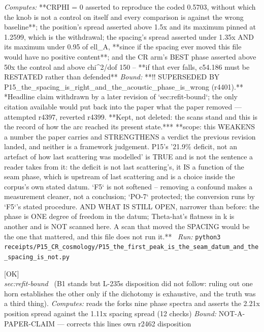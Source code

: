 \begin{description}
\emph{Computes:} **CRPHI = 0 asserted to reproduce the coded 0.5703, without which the knob is not a control on itself and every comparison is against the wrong baseline**; the position's spread asserted above 1.5x and its maximum pinned at 1.2599, which is the withdrawal; the spacing's spread asserted under 1.35x AND its maximum under 0.95 of ell\_A, **since if the spacing ever moved this file would have no positive content**; and the CR arm's BEST phase asserted above 50x the control and above chi\textasciicircum{}2/dof 150 -- **if that ever falls, c54.186 must be RESTATED rather than defended**
 \emph{Bound:} **!! SUPERSEDED BY P15\_the\_spacing\_is\_right\_and\_the\_acoustic\_phase\_is\_wrong (r4401).** *Headline claim withdrawn by a later revision of `sec:refit-bound`; the only citation available would put back into the paper what the paper removed --- attempted r4397, reverted r4399. **Kept, not deleted: the scans stand and this is the record of how the arc reached its present state.*** **scope: this WEAKENS a number the paper carries and STRENGTHENS a verdict the previous revision landed, and neither is a framework judgement. P15's '21.9\% deficit, not an artefact of how last scattering was modelled' is TRUE and is not the sentence a reader takes from it: the deficit is not last scattering's, it IS a function of the seam phase, which is upstream of last scattering and is a choice inside the corpus's own stated datum. `F5` is not softened -- removing a confound makes a measurement cleaner, not a conclusion; `PO-7` protected; the conversion runs by `F5`'s stated procedure. AND WHAT IS STILL OPEN, narrower than before: the phase is ONE degree of freedom in the datum; Theta-hat's flatness in k is another and is NOT scanned here. A scan that moved the SPACING would be the one that mattered, and this file does not run it.**
\ \emph{Run:} \texttt{python3 receipts/P15\_CR\_cosmology/P15\_the\_first\_peak\_is\_the\_seam\_datum\_and\_the\_spacing\_is\_not.py}
\item[\label{rcpt:B3_a_dichotomy_stated_is_not_a_dichotomy_proved}\texttt{B3\_a\_dichotomy\_stated\_is\_not\_a\_dichotomy\_proved}]\hfill\textsf{[OK]}\\
\textit{sec:refit-bound} \ (B1 stands but L-235s disposition did not follow: ruling out one horn establishes the other only if the dichotomy is exhaustive, and the truth was a third thing). 
\emph{Computes:} reads the forks nine phase spectra and asserts the 2.21x position spread against the 1.11x spacing spread (12 checks)
 \emph{Bound:} NOT-A-PAPER-CLAIM --- corrects this lines own r2462 disposition

\end{description}
